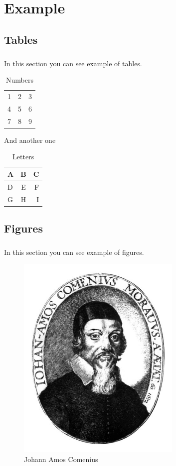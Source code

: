 \chapter{Example}
\section{Tables}
\paragraph{}
In this section you can see example of tables.

\begin{table}[h]
  \centering
  \begin{tabular}{|l c|r|}
    \hline
    1 & 2 & 3 \\
    4 & 5 & 6 \\
    7 & 8 & 9 \\
    \hline
  \end{tabular}
  \caption{Numbers}
  \label{tab:numbers}
\end{table}

And another one

\begin{table}[h]
  \centering
  \begin{tabular}{|l|c|r|}
    \hline
    A & B & C \\ 
    \hline
    D & E & F \\ 
    \hline
    G & H & I \\
    \hline
  \end{tabular}
  \caption{Letters}
  \label{tab:letters}
\end{table}

\section{Figures}
\paragraph{}
In this section you can see example of figures.
\begin{figure}[h]
  \centering
  \includegraphics[height=10cm]{mainmatter/comenius.jpg}
  \caption{Johann Amos Comenius}
  \label{fig:comenius}
\end{figure}

